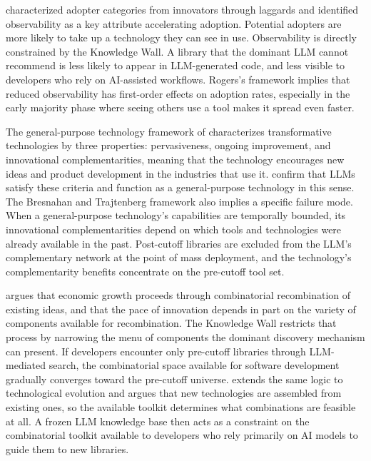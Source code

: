 \documentclass[12pt, a4paper]{report}
\begin{document}
\citet{rogers2003diffusion} characterized adopter categories from innovators through laggards and identified observability as a key attribute accelerating adoption. Potential adopters are more likely to take up a technology they can see in use. Observability is directly constrained by the Knowledge Wall. A library that the dominant LLM cannot recommend is less likely to appear in LLM-generated code, and less visible to developers who rely on AI-assisted workflows. Rogers's framework implies that reduced observability has first-order effects on adoption rates, especially in the early majority phase where seeing others use a tool makes it spread even faster.

The general-purpose technology framework of \citet{bresnahan1995general} characterizes transformative technologies by three properties: pervasiveness, ongoing improvement, and innovational complementarities, meaning that the technology encourages new ideas and product development in the industries that use it. \citet{eloundou2024gpts} confirm that LLMs satisfy these criteria and function as a general-purpose technology in this sense. The Bresnahan and Trajtenberg framework also implies a specific failure mode. When a general-purpose technology's capabilities are temporally bounded, its innovational complementarities depend on which tools and technologies were already available in the past. Post-cutoff libraries are excluded from the LLM's complementary network at the point of mass deployment, and the technology's complementarity benefits concentrate on the pre-cutoff tool set.

\citet{weitzman1998recombinant} argues that economic growth proceeds through combinatorial recombination of existing ideas, and that the pace of innovation depends in part on the variety of components available for recombination. The Knowledge Wall restricts that process by narrowing the menu of components the dominant discovery mechanism can present. If developers encounter only pre-cutoff libraries through LLM-mediated search, the combinatorial space available for software development gradually converges toward the pre-cutoff universe. \citet{arthur2009nature} extends the same logic to technological evolution and argues that new technologies are assembled from existing ones, so the available toolkit determines what combinations are feasible at all. A frozen LLM knowledge base then acts as a constraint on the combinatorial toolkit available to developers who rely primarily on AI models to guide them to new libraries.
\end{document}
